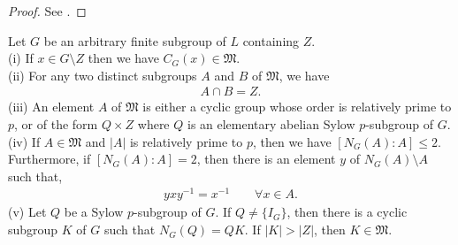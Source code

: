 \begin{proof} See \cite[p.41]{suzuki}.
\end{proof}

\begin{theorem}\label{6.8} Let $G$ be an arbitrary finite subgroup of $L$ containing $Z$. \\

(i) If $x \in G \! \setminus \! Z$ then we have $C_G(x) \in \mathfrak{M}$. \vspace{3mm} \\
(ii) For any two distinct subgroups $A$ and $B$ of $\mathfrak{M}$, we have
\begin{align*} A \cap B = Z. \end{align*}
(iii) An element $A$ of $\mathfrak{M}$ is either a cyclic group whose order is relatively prime to $p$, or of the form $Q \times Z$ where $Q$ is an elementary abelian Sylow $p$-subgroup of $G$. \vspace{3mm} \\
(iv) If $A \in \mathfrak{M}$ and $|A|$ is relatively prime to $p$, then we have $[N_G(A): A] \leq 2$. Furthermore, if $[N_G(A): A] = 2$, then there is an element $y$ of $N_G(A) \! \setminus \! A$ such that, 
\vspace{-1mm}
\begin{align*} yxy^{-1} = x^{-1} \qquad \forall x \in A.\end{align*}
(v) Let $Q$ be a Sylow $p$-subgroup of $G$. If $Q \neq \{I_G\}$, then there is a cyclic subgroup $K$ of $G$ such that $N_G(Q) = QK$. If $|K| > |Z|$, then $K \in \mathfrak{M}$. \\
\end{theorem}

